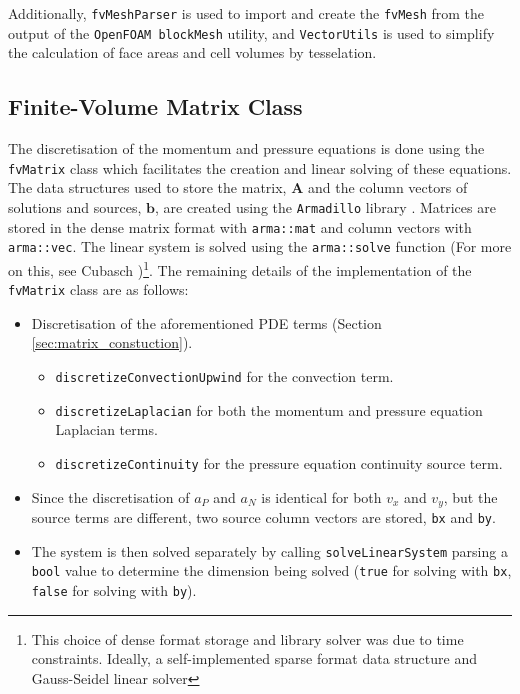 \documentclass[final,3p,times,twocolumn]{elsarticle}
\begin{document}
 Additionally, \texttt{fvMeshParser} is used to import and create the \texttt{fvMesh} from the output of the \texttt{OpenFOAM blockMesh} utility, and \texttt{VectorUtils} is used to simplify the calculation of face areas and cell volumes by tesselation. 

 \subsection{Finite-Volume Matrix Class}
 The discretisation of the momentum and pressure equations is done using the \texttt{fvMatrix} class which facilitates the creation and linear solving of these equations. The data structures used to store the matrix, $\mathbf{A}$ and the column vectors of solutions and sources, $\mathbf{b}$, are created using the \texttt{Armadillo} library  \cite{Cubasch2010Armadillo:Experiments}. Matrices are stored in the dense matrix format with \texttt{arma::mat} and column vectors with \texttt{arma::vec}. The linear system is solved using the \texttt{arma::solve} function (For more on this, see Cubasch \cite{Cubasch2010Armadillo:Experiments})\footnote{This choice of dense format storage and library solver was due to time constraints. Ideally, a self-implemented sparse format data structure and Gauss-Seidel linear solver}. 
 The remaining details of the implementation of the \texttt{fvMatrix} class are as follows:
\begin{itemize}
    \item Discretisation of the aforementioned PDE terms (Section \ref{sec:matrix_constuction}). 
        \begin{itemize}
            \item \texttt{discretizeConvectionUpwind} for the convection term.
            \item \texttt{discretizeLaplacian} for both the momentum and pressure equation Laplacian terms.
            \item \texttt{discretizeContinuity} for the pressure equation continuity source term.
        \end{itemize}
    \item Since the discretisation of $a_P$ and $a_N$ is identical for both $v_x$ and $v_y$, but the source terms are different, two source column vectors are stored, \texttt{bx} and \texttt{by}. 
    \item The system is then solved separately by calling \texttt{solveLinearSystem} parsing a \texttt{bool} value to determine the dimension being solved (\texttt{true} for solving with \texttt{bx}, \texttt{false} for solving with \texttt{by}).
\end{itemize}
\end{document}
